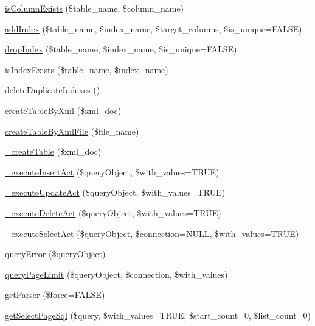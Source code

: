 \begin{DoxyCompactItemize}
\hyperlink{classDBCubrid_a76c8d9dd51a3e64f18b8d1f4da318ac7}{is\+Column\+Exists} (\$table\+\_\+name, \$column\+\_\+name)
\item 
\hyperlink{classDBCubrid_a57c81b55423f07caa0c021229c7ffa07}{add\+Index} (\$table\+\_\+name, \$index\+\_\+name, \$target\+\_\+columns, \$is\+\_\+unique=F\+A\+L\+SE)
\item 
\hyperlink{classDBCubrid_a11876878e4a688f8d3407aaa93ffd86e}{drop\+Index} (\$table\+\_\+name, \$index\+\_\+name, \$is\+\_\+unique=F\+A\+L\+SE)
\item 
\hyperlink{classDBCubrid_a75f56bf8e79addb01bc19910e91a2730}{is\+Index\+Exists} (\$table\+\_\+name, \$index\+\_\+name)
\item 
\hyperlink{classDBCubrid_a9035338394680f8400735de946506d85}{delete\+Duplicate\+Indexes} ()
\item 
\hyperlink{classDBCubrid_a63b7c263f7626877bba41d7072562043}{create\+Table\+By\+Xml} (\$xml\+\_\+doc)
\item 
\hyperlink{classDBCubrid_ac94184ec9952bbfee913f3295806fbfe}{create\+Table\+By\+Xml\+File} (\$file\+\_\+name)
\item 
\hyperlink{classDBCubrid_abe5eb360cf9f08ecb9114d082dd24660}{\+\_\+create\+Table} (\$xml\+\_\+doc)
\item 
\hyperlink{classDBCubrid_a64e0e0229136638b2497561cd32432f8}{\+\_\+execute\+Insert\+Act} (\$query\+Object, \$with\+\_\+values=T\+R\+UE)
\item 
\hyperlink{classDBCubrid_ae9ac1a643d44ff77e59f07aca99a5983}{\+\_\+execute\+Update\+Act} (\$query\+Object, \$with\+\_\+values=T\+R\+UE)
\item 
\hyperlink{classDBCubrid_ac296beebeee54f80e9224f74ec9a0aaa}{\+\_\+execute\+Delete\+Act} (\$query\+Object, \$with\+\_\+values=T\+R\+UE)
\item 
\hyperlink{classDBCubrid_a55e0eb703828c9ae33c0903b896926d0}{\+\_\+execute\+Select\+Act} (\$query\+Object, \$connection=N\+U\+LL, \$with\+\_\+values=T\+R\+UE)
\item 
\hyperlink{classDBCubrid_a42e2cdbc9f4cf75a047a48c42b7bc405}{query\+Error} (\$query\+Object)
\item 
\hyperlink{classDBCubrid_a9a6b86f98f01fb511c6f8f28f0010395}{query\+Page\+Limit} (\$query\+Object, \$connection, \$with\+\_\+values)
\item 
\hyperlink{classDBCubrid_a9c9bbb9e0958527af5e3ebcfb427b496}{get\+Parser} (\$force=F\+A\+L\+SE)
\item 
\hyperlink{classDBCubrid_ace7731acbdb4ed72497be48092b0997f}{get\+Select\+Page\+Sql} (\$query, \$with\+\_\+values=T\+R\+UE, \$start\+\_\+count=0, \$list\+\_\+count=0)
\end{DoxyCompactItemize}
